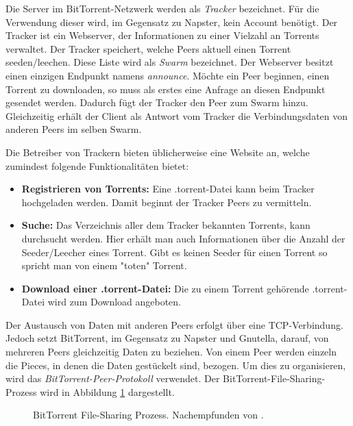 Die Server im BitTorrent-Netzwerk werden als \emph{Tracker} bezeichnet. Für die Verwendung dieser wird, im Gegensatz zu Napster, kein Account benötigt. Der Tracker ist ein Webserver, der Informationen zu einer Vielzahl an Torrents verwaltet. Der Tracker speichert, welche Peers aktuell einen Torrent seeden/leechen. Diese Liste wird als \emph{Swarm} bezeichnet. Der Webserver besitzt einen einzigen Endpunkt namens \emph{announce}. Möchte ein Peer beginnen, einen Torrent zu downloaden, so muss als erstes eine Anfrage an diesen Endpunkt gesendet werden. Dadurch fügt der Tracker den Peer zum Swarm hinzu. Gleichzeitig erhält der Client als Antwort vom Tracker die Verbindungsdaten von anderen Peers im selben Swarm.

Die Betreiber von Trackern bieten üblicherweise eine Website an, welche zumindest folgende Funktionalitäten bietet:
\begin{itemize}
    \item \textbf{Registrieren von Torrents:} Eine .torrent-Datei kann beim Tracker hochgeladen werden. Damit beginnt der Tracker Peers zu vermitteln. 
    \item \textbf{Suche:} Das Verzeichnis aller dem Tracker bekannten Torrents, kann durchsucht werden. Hier erhält man auch Informationen über die Anzahl der Seeder/Leecher eines Torrent. Gibt es keinen Seeder für einen Torrent so spricht man von einem "toten" Torrent.
    \item \textbf{Download einer .torrent-Datei:} Die zu einem Torrent gehörende .torrent-Datei wird zum Download angeboten. 
\end{itemize}
    
Der Austausch von Daten mit anderen Peers erfolgt über eine TCP-Verbindung. Jedoch setzt BitTorrent, im Gegensatz zu Napster und Gnutella, darauf, von mehreren Peers gleichzeitig Daten zu beziehen. Von einem Peer werden einzeln die Pieces, in denen die Daten gestückelt sind, bezogen.
Um dies zu organisieren, wird das \emph{BitTorrent-Peer-Protokoll} verwendet. 
Der BitTorrent-File-Sharing-Prozess wird in Abbildung \ref{fig:BitTorrentProcess} dargestellt.

\begin{figure}[]
    \centering
    \caption{BitTorrent File-Sharing Prozess. Nachempfunden von \textcite{xia2010survey}. }
    \label{fig:BitTorrentProcess}
\end{figure}


